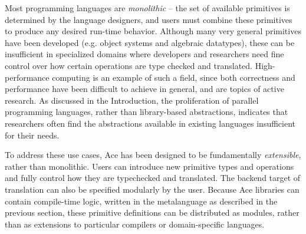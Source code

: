 \documentclass[10pt]{sigplanconf}
\begin{document}
Most programming languages are {\em monolithic} -- the set of available primitives is determined by the language designers, and users must combine these primitives to produce any desired run-time behavior. Although many very general primitives have been developed (e.g. object systems and algebraic datatypes), these can be insufficient in specialized domains where developers and researchers need fine control over how certain operations are type checked and translated. High-performance computing is an example of such a field, since both correctness and performance have been difficult to achieve in general, and are topics of active research. As discussed in the Introduction, the proliferation of parallel programming languages, rather than library-based abstractions, indicates that researchers often find the abstractions available in existing languages insufficient for their needs.

To address these use cases, Ace has been designed to be fundamentally {\em extensible}, rather than monolithic. Users can introduce new primitive types and operations and fully control how they are typechecked and translated. The backend target of translation can also be specified modularly by the user. Because Ace libraries can contain compile-time logic, written in the metalanguage as described in the previous section, these primitive definitions can be distributed as modules, rather than as extensions to particular compilers or domain-specific languages.
\end{document}
